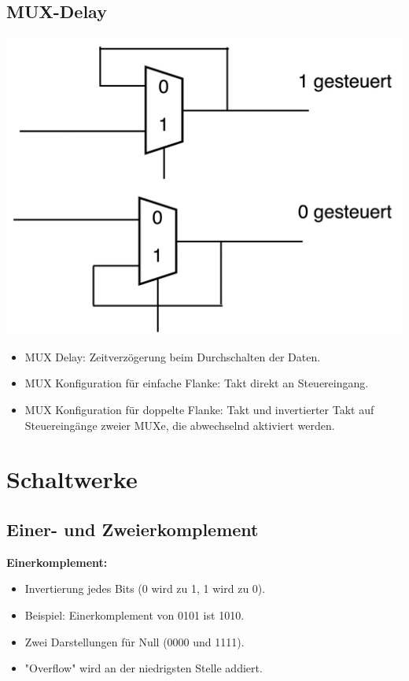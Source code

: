 \documentclass[a4paper,6pt]{article}
\begin{document}
\begin{multicols*}{3}
\subsection{MUX-Delay}

\begin{center}
    \includegraphics[width=0.75\linewidth]{resources/Bildschirmfoto 2024-01-04 um 10.36.08.png}
\end{center}

\begin{itemize}
    \item MUX Delay: Zeitverzögerung beim Durchschalten der Daten.
    \item MUX Konfiguration für einfache Flanke: Takt direkt an Steuereingang.
    \item MUX Konfiguration für doppelte Flanke: Takt und invertierter Takt auf Steuereingänge zweier MUXe, die abwechselnd aktiviert werden.
\end{itemize}

\section{Schaltwerke}

\subsection*{Einer- und Zweierkomplement}

\textbf{Einerkomplement:}
\begin{itemize}
    \item Invertierung jedes Bits (0 wird zu 1, 1 wird zu 0).
    \item Beispiel: Einerkomplement von 0101 ist 1010.
    \item Zwei Darstellungen für Null (0000 und 1111).
    \item "Overflow" wird an der niedrigsten Stelle addiert.
\end{itemize}


\end{multicols*}
\end{document}
